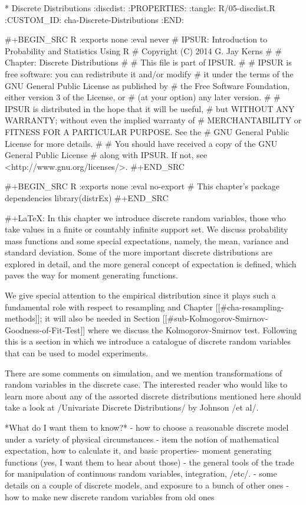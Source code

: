 * Discrete Distributions                                           :discdist:
:PROPERTIES:
:tangle: R/05-discdist.R
:CUSTOM_ID: cha-Discrete-Distributions
:END:

#+BEGIN_SRC R :exports none :eval never
#    IPSUR: Introduction to Probability and Statistics Using R
#    Copyright (C) 2014  G. Jay Kerns
#
#    Chapter: Discrete Distributions
#
#    This file is part of IPSUR.
#
#    IPSUR is free software: you can redistribute it and/or modify
#    it under the terms of the GNU General Public License as published by
#    the Free Software Foundation, either version 3 of the License, or
#    (at your option) any later version.
#
#    IPSUR is distributed in the hope that it will be useful,
#    but WITHOUT ANY WARRANTY; without even the implied warranty of
#    MERCHANTABILITY or FITNESS FOR A PARTICULAR PURPOSE.  See the
#    GNU General Public License for more details.
#
#    You should have received a copy of the GNU General Public License
#    along with IPSUR.  If not, see <http://www.gnu.org/licenses/>.
#+END_SRC

#+BEGIN_SRC R :exports none :eval no-export
# This chapter's package dependencies
library(distrEx)
#+END_SRC

#+LaTeX: \noindent 
In this chapter we introduce discrete random variables, those who take
values in a finite or countably infinite support set. We discuss
probability mass functions and some special expectations, namely, the
mean, variance and standard deviation. Some of the more important
discrete distributions are explored in detail, and the more general
concept of expectation is defined, which paves the way for moment
generating functions.

We give special attention to the empirical distribution since it plays
such a fundamental role with respect to resampling and Chapter
[[#cha-resampling-methods]]; it will also be needed in Section
[[#sub-Kolmogorov-Smirnov-Goodness-of-Fit-Test]] where we discuss the Kolmogorov-Smirnov
test. Following this is a section in which we introduce a catalogue of
discrete random variables that can be used to model experiments.

There are some comments on simulation, and we mention transformations
of random variables in the discrete case. The interested reader who
would like to learn more about any of the assorted discrete
distributions mentioned here should take a look at /Univariate
Discrete Distributions/ by Johnson /et al/\cite{Johnson1993}.

*What do I want them to know?*
- how to choose a reasonable discrete model under a variety of
  physical circumstances
- item the notion of mathematical expectation, how to calculate it,
  and basic properties- moment generating functions (yes, I want them
  to hear about those)
- the general tools of the trade for manipulation of continuous random
  variables, integration, /etc/.
- some details on a couple of discrete models, and exposure to a bunch
  of other ones
- how to make new discrete random variables from old ones

